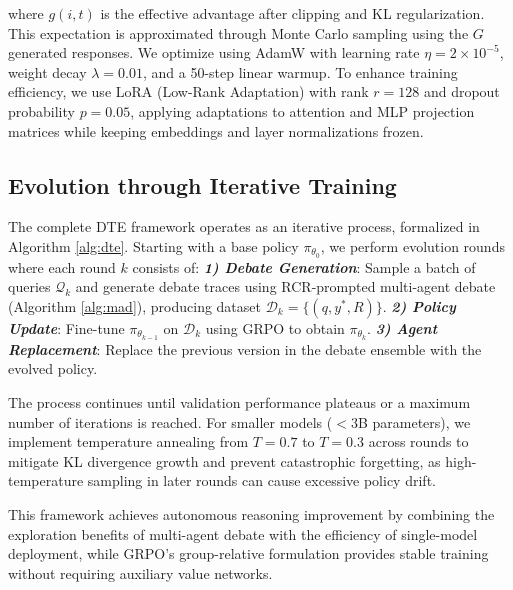 \documentclass[11pt]{article}
\begin{document}
where $g(i,t)$ is the effective advantage after clipping and KL regularization. This expectation is approximated through Monte Carlo sampling using the $G$ generated responses. We optimize using AdamW with learning rate $\eta = 2 \times 10^{-5}$, weight decay $\lambda = 0.01$, and a 50-step linear warmup. To enhance training efficiency, we use LoRA (Low-Rank Adaptation) with rank $r = 128$ and dropout probability $p = 0.05$, applying adaptations to attention and MLP projection matrices while keeping embeddings and layer normalizations frozen.

\subsection{Evolution through Iterative Training}
\label{sec:evolution}

The complete \textsc{DTE} framework operates as an iterative process, formalized in Algorithm \ref{alg:dte}. Starting with a base policy $\pi_{\theta_0}$, we perform evolution rounds where each round $k$ consists of: \textbf{\textit{1) Debate Generation}}: Sample a batch of queries $\mathcal{Q}_k$ and generate debate traces using RCR-prompted multi-agent debate (Algorithm \ref{alg:mad}), producing dataset $\mathcal{D}_k = \{(q, y^*, R)\}$. \textbf{\textit{2) Policy Update}}: Fine-tune $\pi_{\theta_{k-1}}$ on $\mathcal{D}_k$ using GRPO to obtain $\pi_{\theta_k}$. \textbf{\textit{3) Agent Replacement}}: Replace the previous version in the debate ensemble with the evolved policy.

The process continues until validation performance plateaus or a maximum number of iterations is reached. For smaller models ($<3$B parameters), we implement temperature annealing from $T=0.7$ to $T=0.3$ across rounds to mitigate KL divergence growth and prevent catastrophic forgetting, as high-temperature sampling in later rounds can cause excessive policy drift.

This framework achieves autonomous reasoning improvement by combining the exploration benefits of multi-agent debate with the efficiency of single-model deployment, while GRPO's group-relative formulation provides stable training without requiring auxiliary value networks.
\end{document}
